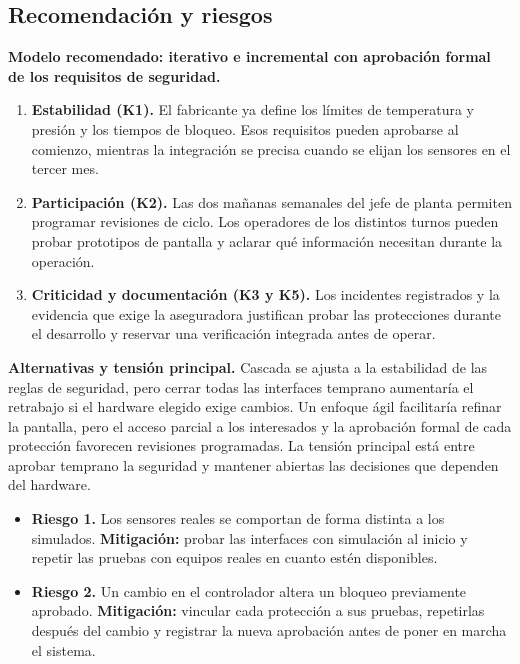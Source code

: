 \documentclass[11pt,a4paper]{article}
\begin{document}
\subsection{Recomendación y riesgos}

\textbf{Modelo recomendado: iterativo e incremental con aprobación formal de los requisitos de seguridad.}

\begin{enumerate}
    \item \textbf{Estabilidad (K1).} El fabricante ya define los límites de temperatura y presión y los tiempos de bloqueo. Esos requisitos pueden aprobarse al comienzo, mientras la integración se precisa cuando se elijan los sensores en el tercer mes.
    \item \textbf{Participación (K2).} Las dos mañanas semanales del jefe de planta permiten programar revisiones de ciclo. Los operadores de los distintos turnos pueden probar prototipos de pantalla y aclarar qué información necesitan durante la operación.
    \item \textbf{Criticidad y documentación (K3 y K5).} Los incidentes registrados y la evidencia que exige la aseguradora justifican probar las protecciones durante el desarrollo y reservar una verificación integrada antes de operar.
\end{enumerate}

\textbf{Alternativas y tensión principal.}
Cascada se ajusta a la estabilidad de las reglas de seguridad, pero cerrar todas las interfaces temprano aumentaría el retrabajo si el hardware elegido exige cambios. Un enfoque ágil facilitaría refinar la pantalla, pero el acceso parcial a los interesados y la aprobación formal de cada protección favorecen revisiones programadas. La tensión principal está entre aprobar temprano la seguridad y mantener abiertas las decisiones que dependen del hardware.

\begin{itemize}
    \item \textbf{Riesgo 1.} Los sensores reales se comportan de forma distinta a los simulados. \textbf{Mitigación:} probar las interfaces con simulación al inicio y repetir las pruebas con equipos reales en cuanto estén disponibles.
    \item \textbf{Riesgo 2.} Un cambio en el controlador altera un bloqueo previamente aprobado. \textbf{Mitigación:} vincular cada protección a sus pruebas, repetirlas después del cambio y registrar la nueva aprobación antes de poner en marcha el sistema.
\end{itemize}
\end{document}
